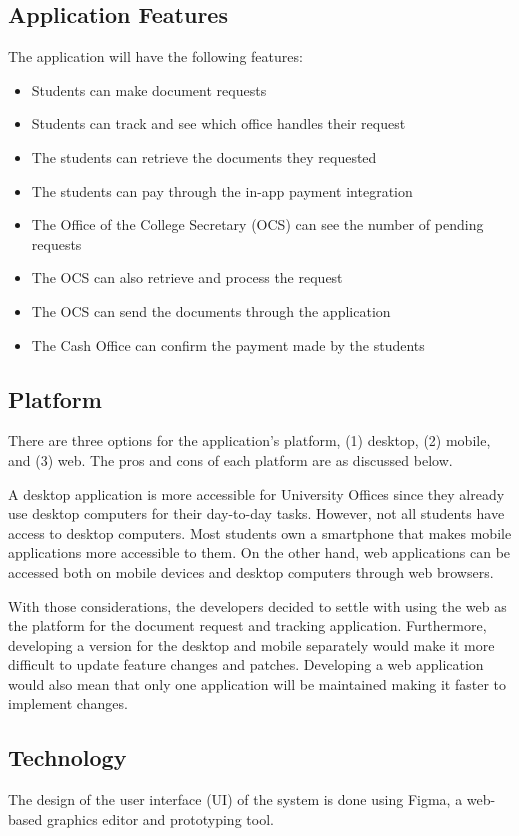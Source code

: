 \subsection{Application Features}
The application will have the following features:
\begin{itemize}
   \item Students can make document requests
   \item Students can track and see which office handles their request
   \item The students can retrieve the documents they requested
   \item The students can pay through the in-app payment integration
   \item The Office of the College Secretary (OCS) can see the number of pending requests
   \item The OCS can also retrieve and process the request
   \item The OCS can send the documents through the application
   \item The Cash Office can confirm the payment made by the students

\end{itemize}

\subsection{Platform}
There are three options for the application’s platform, (1) desktop, (2) mobile, and (3) web. The pros and cons of each platform are as discussed below.

A desktop application is more accessible for University Offices since they already use desktop computers for their day-to-day tasks. However, not all students have access to desktop computers. Most students own a smartphone that makes mobile applications more accessible to them. On the other hand, web applications can be accessed both on mobile devices and desktop computers through web browsers.

With those considerations, the developers decided to settle with using the web as the platform for the document request and tracking application. Furthermore, developing a version for the desktop and mobile separately would make it more difficult to update feature changes and patches. Developing a web application would also mean that only one application will be maintained making it faster to implement changes.
\subsection{Technology}
The design of the user interface (UI) of the system is done using Figma, a web-based graphics editor and prototyping tool.

